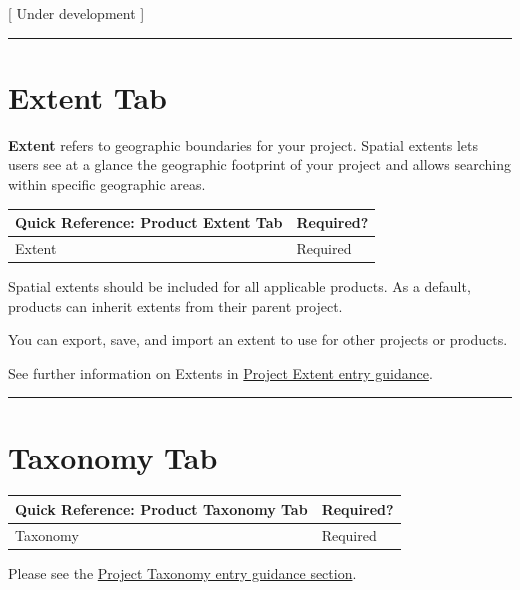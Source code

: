\documentclass[
]{book}
\makeatletter
\newenvironment{kframe}{%
\medskip{}
\setlength{\fboxsep}{.8em}
 \def\at@end@of@kframe{}%
 \ifinner\ifhmode%
  \def\at@end@of@kframe{\end{minipage}}%
  \begin{minipage}{\columnwidth}%
 \fi\fi%
 \def\FrameCommand##1{\hskip\@totalleftmargin \hskip-\fboxsep
 \colorbox{shadecolor}{##1}\hskip-\fboxsep
     \hskip-\linewidth \hskip-\@totalleftmargin \hskip\columnwidth}%
 \MakeFramed {\advance\hsize-\width
   \@totalleftmargin\z@ \linewidth\hsize
   \@setminipage}}%
 {\par\unskip\endMakeFramed%
 \at@end@of@kframe}
\newenvironment{rmdblock}[1]
  {
  \begin{itemize}
  \renewcommand{\labelitemi}{
    \raisebox{-.7\height}[0pt][0pt]{
      {\setkeys{Gin}{width=3em,keepaspectratio}\texttt{[image: images/\#1]}}
    }
  }
  \setlength{\fboxsep}{1em}
  \begin{kframe}
  \item
  }
  {
  \end{kframe}
  \end{itemize}
  }
\newenvironment{rmdtip}
  {\begin{rmdblock}{tip}}
  {\end{rmdblock}}
\makeatother
\begin{document}
{[} Under development {]}

\begin{center}\rule{0.5\linewidth}{\linethickness}\end{center}

\hypertarget{product-extent}{%
\section*{Extent Tab}\label{product-extent}}

\textbf{Extent} refers to geographic boundaries for your project. Spatial extents lets users see at a glance the geographic footprint of your project and allows searching within specific geographic areas.

\begin{longtable}[]{@{}ll@{}}
\toprule
Quick Reference: Product Extent Tab & Required?\tabularnewline
\midrule
\endhead
Extent & Required\tabularnewline
\bottomrule
\end{longtable}

Spatial extents should be included for all applicable products. As a default, products can inherit extents from their parent project.

\begin{rmdtip}
You can export, save, and import an extent to use for other projects or
products.
\end{rmdtip}

See further information on Extents in \protect\hyperlink{project-extent}{Project Extent entry guidance}.

\begin{center}\rule{0.5\linewidth}{\linethickness}\end{center}

\hypertarget{product-taxonomy}{%
\section*{Taxonomy Tab}\label{product-taxonomy}}

\begin{longtable}[]{@{}ll@{}}
\toprule
Quick Reference: Product Taxonomy Tab & Required?\tabularnewline
\midrule
\endhead
Taxonomy & Required\tabularnewline
\bottomrule
\end{longtable}

Please see the \protect\hyperlink{project-taxonomy}{Project Taxonomy entry guidance section}.
\end{document}
